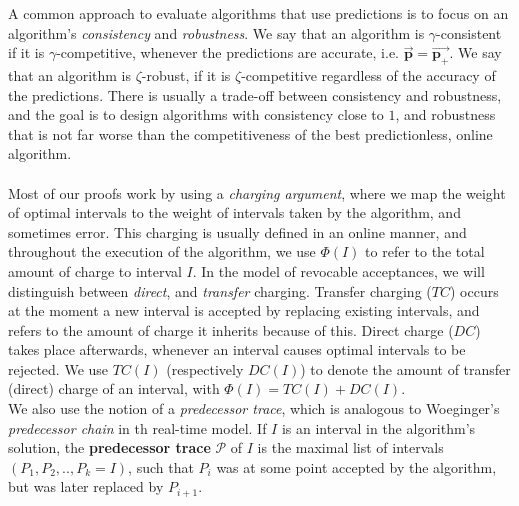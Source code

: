 A common approach to evaluate algorithms that use predictions is to focus on an algorithm's \textit{consistency} and \textit{robustness}. We say that an algorithm is $\gamma$-consistent if it is $\gamma$-competitive, whenever the predictions are accurate, i.e. $\overrightarrow{\textbf{p}} = \overrightarrow{\textbf{p}_{+}}$. We say that an algorithm is $\zeta$-robust, if it is $\zeta$-competitive regardless of the accuracy of the predictions. There is usually a trade-off between consistency and robustness, and the goal is to design algorithms with consistency close to $1$, and robustness that is not far worse than the competitiveness of the best predictionless, online algorithm.\\\\
Most of our proofs work by using a \textit{charging argument}, where we map the weight of optimal intervals to the weight of intervals taken by the algorithm, and sometimes error. This charging is usually defined in an online manner, and throughout the execution of the algorithm, we use $\Phi(I)$ to refer to the total amount of charge to interval $I$. In the model of revocable acceptances, we will distinguish between \textit{direct}, and \textit{transfer} charging. Transfer charging ($TC$) occurs at the moment a new interval is accepted by replacing existing intervals, and refers to the amount of charge it inherits because of this. Direct charge ($DC$) takes place afterwards, whenever an interval causes optimal intervals to be rejected. We use $TC(I)$ (respectively $DC(I)$) to denote the amount of transfer (direct) charge of an interval, with $\Phi(I) = TC(I) + DC(I)$.\\
We also use the notion of a \textit{predecessor trace}, which is analogous to Woeginger's \cite{woeginger1994line} \textit{predecessor chain} in th real-time model. If $I$ is an interval in the algorithm's solution, the \textbf{predecessor trace} $\mathcal{P}$ of $I$ is the maximal list of intervals $(P_1,P_2,..,P_k = I)$, such that $P_i$ was at some point accepted by the algorithm, but was later replaced by $P_{i+1}$. 
